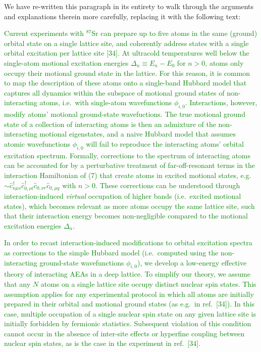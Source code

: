 \documentclass[preprint]{revtex4-1}
\renewcommand{\c}{\hat{c}}
\newcommand{\1}{\mathds{1}}
\newcommand{\green}[1]{\textcolor{green}{#1}}
\begin{document}
\begin{enumerate}
  We have re-written this paragraph in its entirety to walk through
  the arguments and explanations therein more carefully, replacing it
  with the following text:

  \green{Current experiments with ${}^{87}$Sr can prepare up to five
    atoms in the same (ground) orbital state on a single lattice site,
    and coherently address states with a single orbital excitation per
    lattice site [34].  At ultracold temperatures well below the
    single-atom motional excitation energies $\Delta_n\equiv E_n-E_0$
    for $n>0$, atoms only occupy their motional ground state in the
    lattice.  For this reason, it is common to map the description of
    these atoms onto a single-band Hubbard model that captures all
    dynamics within the subspace of motional ground states of
    non-interacting atoms, i.e.~with single-atom wavefunctions
    $\phi_{i,0}$.  Interactions, however, modify atoms' motional
    ground-state wavefuctions.  The true motional ground state of a
    collection of interacting atoms is then an admixture of the
    non-interacting motional eigenstates, and a naive Hubbard model
    that assumes atomic wavefunctions $\phi_{i,0}$ will fail to
    reproduce the interacting atoms' orbital excitation spectrum.
    Formally, corrections to the spectrum of interacting atoms can be
    accounted for by a perturbative treatment of far-off-resonant
    terms in the interaction Hamiltonian of (7) that create atoms in
    excited motional states,
    e.g.~$\sim\c_{n\mu s}^\dag \c_{0,\nu t}^\dag \c_{0,\nu r}
    \c_{0,\mu q}$ with $n>0$.  These corrections can be understood
    through interaction-induced {\it virtual} occupation of higher
    bands (i.e.~excited motional states), which becomes relevant as
    more atoms occupy the same lattice site, such that their
    interaction energy becomes non-negligible compared to the motional
    excitation energies $\Delta_n$.}

  \green{In order to recast interaction-induced modifications to
    orbital excitation spectra as corrections to the simple Hubbard
    model (i.e.~computed using the non-interacting ground-state
    wavefunctions $\phi_{i,0}$), we develop a low-energy effective
    theory of interacting AEAs in a deep lattice.  To simplify our
    theory, we assume that any $N$ atoms on a single lattice site
    occupy distinct nuclear spin states.  This assumption applies for
    any experimental protocol in which all atoms are initially
    prepared in their orbital and motional ground states (as e.g.~in
    ref.~[34]).  In this case, multiple occupation of a single nuclear
    spin state on any given lattice site is initially forbidden by
    fermionic statistics.  Subsequent violation of this condition
    cannot occur in the absence of inter-site effects or hyperfine
    coupling between nuclear spin states, as is the case in the
    experiment in ref.~[34].}


\end{enumerate}
\end{document}
